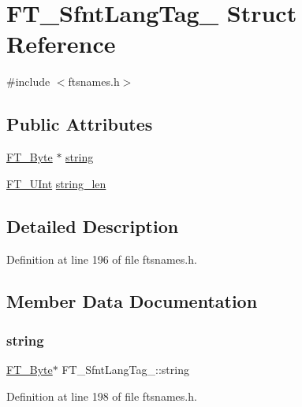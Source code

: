\hypertarget{struct_f_t___sfnt_lang_tag__}{}\section{F\+T\+\_\+\+Sfnt\+Lang\+Tag\+\_\+ Struct Reference}
\label{struct_f_t___sfnt_lang_tag__}


{\ttfamily \#include $<$ftsnames.\+h$>$}

\subsection*{Public Attributes}
\begin{DoxyCompactItemize}
\item 
\mbox{\hyperlink{fttypes_8h_a51f26183ca0c9f4af958939648caeccd}{F\+T\+\_\+\+Byte}} $\ast$ \mbox{\hyperlink{struct_f_t___sfnt_lang_tag___a407651359548d5c45939bf2fda1692db}{string}}
\item 
\mbox{\hyperlink{fttypes_8h_abcb8db4dbf35d2b55a9e8c7b0926dc52}{F\+T\+\_\+\+U\+Int}} \mbox{\hyperlink{struct_f_t___sfnt_lang_tag___ad4789510e3dd1f515259cb59abc1d44c}{string\+\_\+len}}
\end{DoxyCompactItemize}


\subsection{Detailed Description}


Definition at line 196 of file ftsnames.\+h.



\subsection{Member Data Documentation}
\mbox{\label{struct_f_t___sfnt_lang_tag___a407651359548d5c45939bf2fda1692db}} 
\subsubsection{\texorpdfstring{string}{string}}
{\footnotesize\ttfamily \mbox{\hyperlink{fttypes_8h_a51f26183ca0c9f4af958939648caeccd}{F\+T\+\_\+\+Byte}}$\ast$ F\+T\+\_\+\+Sfnt\+Lang\+Tag\+\_\+\+::string}



Definition at line 198 of file ftsnames.\+h.

